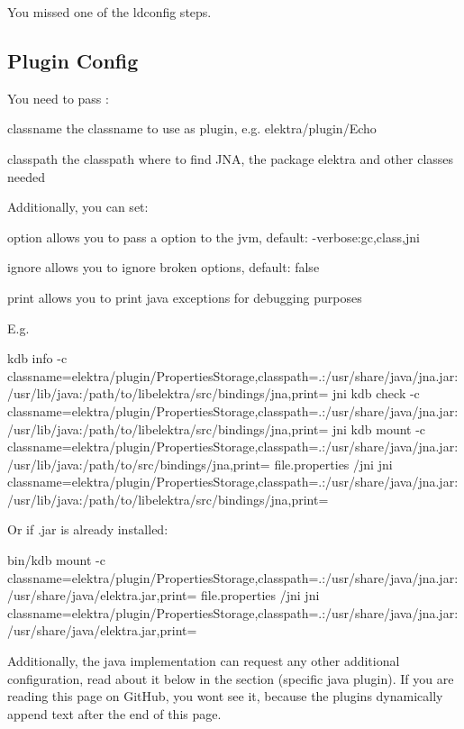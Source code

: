 You missed one of the ldconfig steps.

\subsection*{Plugin Config}

You need to pass \+:
\begin{DoxyItemize}
\item classname the classname to use as plugin, e.\+g. {\ttfamily elektra/plugin/\+Echo}
\item classpath the classpath where to find J\+NA, the package elektra and other classes needed
\end{DoxyItemize}

Additionally, you can set\+:


\begin{DoxyItemize}
\item option allows you to pass a option to the jvm, default\+: {\ttfamily -\/verbose\+:gc,class,jni}
\item ignore allows you to ignore broken options, default\+: {\ttfamily false}
\item print allows you to print java exceptions for debugging purposes
\end{DoxyItemize}

E.\+g. \begin{DoxyVerb}kdb info -c classname=elektra/plugin/PropertiesStorage,classpath=.:/usr/share/java/jna.jar:/usr/lib/java:/path/to/libelektra/src/bindings/jna,print= jni
kdb check -c classname=elektra/plugin/PropertiesStorage,classpath=.:/usr/share/java/jna.jar:/usr/lib/java:/path/to/libelektra/src/bindings/jna,print= jni
kdb mount -c classname=elektra/plugin/PropertiesStorage,classpath=.:/usr/share/java/jna.jar:/usr/lib/java:/path/to/src/bindings/jna,print= file.properties /jni jni classname=elektra/plugin/PropertiesStorage,classpath=.:/usr/share/java/jna.jar:/usr/lib/java:/path/to/libelektra/src/bindings/jna,print=
\end{DoxyVerb}


Or if {\ttfamily .jar} is already installed\+: \begin{DoxyVerb}bin/kdb mount -c classname=elektra/plugin/PropertiesStorage,classpath=.:/usr/share/java/jna.jar:/usr/share/java/elektra.jar,print= file.properties /jni jni classname=elektra/plugin/PropertiesStorage,classpath=.:/usr/share/java/jna.jar:/usr/share/java/elektra.jar,print=
\end{DoxyVerb}


Additionally, the java implementation can request any other additional configuration, read about it below in the section (specific java plugin). If you are reading this page on Git\+Hub, you won\textquotesingle{}t see it, because the plugins dynamically append text after the end of this page.

